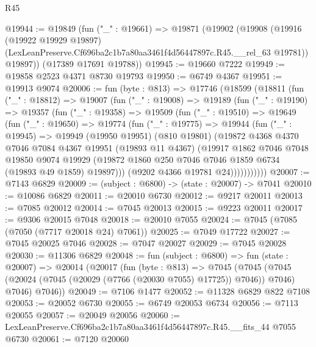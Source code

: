 \begin{lexlean}{R45}
\begin{coremodule}
{@19944 := @19849
    (fun ("_" : @19661) =>
    @19871
      (@19902
        (@19908
          (@19916
            (@19922 @19929 @19897)
            (LexLeanPreserve.Cf696ba2c1b7a80aa3461f4d56447897c.R45.__rel_63 @19781))
          @19897))
      (@17389 @17691 @19788))
@19945 := @19660 @7222
@19949 := @19858 @2523 @4371 @8730 @19793
@19950 := @6749 @4367
@19951 := @19913 @9074
@20006 := fun (byte : @813) =>
  @17746
    (@18599
      (@18811
        (fun ("_" : @18812) =>
        @19007
          (fun ("_" : @19008) =>
          @19189
            (fun ("_" : @19190) =>
            @19357
              (fun ("_" : @19358) =>
              @19509
                (fun ("_" : @19510) =>
                @19649
                  (fun ("_" : @19650) =>
                  @19774
                    (fun ("_" : @19775) =>
                    @19944
                      (fun ("_" : @19945) =>
                      @19949
                        (@19950 @19951)
                        (@810 @19801)
                        (@19872
                          @4368
                          @4370
                          @7046
                          @7084
                          @4367
                          @19951
                          (@19893 @11 @4367)
                          (@19917
                            @1862
                            @7046
                            @7048
                            @19850
                            @9074
                            @19929
                            (@19872 @1860 @250 @7046 @7046 @1859 @6734 (@19893 @49 @1859) @19897)))
                        (@9202 @4366 @19781 @24)))))))))))
@20007 := @7143 @6829
@20009 := (subject : @6800) -> (state : @20007) -> @7041
@20010 := @10086 @6829
@20011 := @20010 @6730
@20012 := @9217 @20011
@20013 := @7085 @20012
@20014 := @7045 @20013
@20015 := @9223 @20011
@20017 := @9306 @20015 @7048
@20018 := @20010 @7055
@20024 := @7045 (@7085 (@7050 (@7717 @20018 @24) @7061))
@20025 := @7049 @17722
@20027 := @7045 @20025 @7046
@20028 := @7047 @20027
@20029 := @7045 @20028
@20030 := @11306 @6829
@20048 := fun (subject : @6800) =>
  fun (state : @20007) =>
  @20014
    (@20017
      (fun (byte : @813) =>
      @7045
        (@7045 (@7045 (@20024 (@7045 (@20029 (@7766 (@20030 @7055) @17725)) @7046)) @7046) @7046)
        @7046))
@20049 := @7106 @1477
@20052 := @11328 @6829 @822 @7108
@20053 := @20052 @6730
@20055 := @6749 @20053 @6734
@20056 := @7113 @20055
@20057 := @20049 @20056
@20060 := LexLeanPreserve.Cf696ba2c1b7a80aa3461f4d56447897c.R45.__fits_44 @7055 @6730
@20061 := @7120 @20060
}
\end{coremodule}
\end{lexlean}
